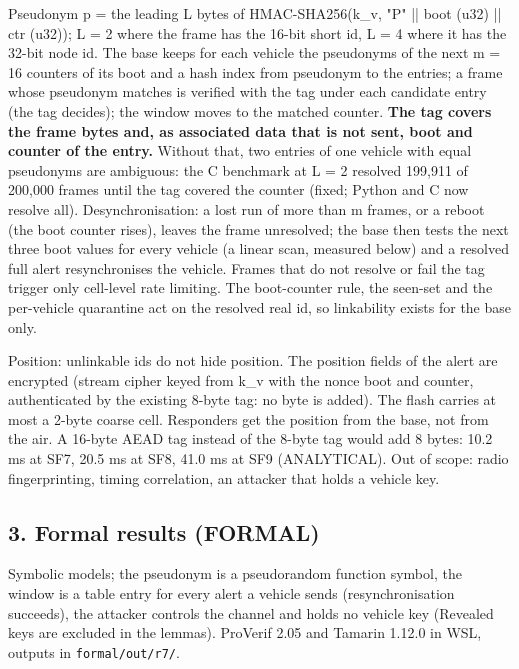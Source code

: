 Pseudonym p = the leading L bytes of HMAC-SHA256(k\_v, "P" || boot (u32) || ctr (u32)); L = 2 where the frame has the 16-bit short id, L = 4 where it has the 32-bit node id. The base keeps for each vehicle the pseudonyms of the next m = 16 counters of its boot and a hash index from pseudonym to the entries; a frame whose pseudonym matches is verified with the tag under each candidate entry (the tag decides); the window moves to the matched counter. \textbf{The tag covers the frame bytes and, as associated data that is not sent, boot and counter of the entry.} Without that, two entries of one vehicle with equal pseudonyms are ambiguous: the C benchmark at L = 2 resolved 199,911 of 200,000 frames until the tag covered the counter (fixed; Python and C now resolve all). Desynchronisation: a lost run of more than m frames, or a reboot (the boot counter rises), leaves the frame unresolved; the base then tests the next three boot values for every vehicle (a linear scan, measured below) and a resolved full alert resynchronises the vehicle. Frames that do not resolve or fail the tag trigger only cell-level rate limiting. The boot-counter rule, the seen-set and the per-vehicle quarantine act on the resolved real id, so linkability exists for the base only.

Position: unlinkable ids do not hide position. The position fields of the alert are encrypted (stream cipher keyed from k\_v with the nonce boot and counter, authenticated by the existing 8-byte tag: no byte is added). The flash carries at most a 2-byte coarse cell. Responders get the position from the base, not from the air. A 16-byte AEAD tag instead of the 8-byte tag would add 8 bytes: 10.2 ms at SF7, 20.5 ms at SF8, 41.0 ms at SF9 (ANALYTICAL). Out of scope: radio fingerprinting, timing correlation, an attacker that holds a vehicle key.

\subsection*{3. Formal results (FORMAL)}

Symbolic models; the pseudonym is a pseudorandom function symbol, the window is a table entry for every alert a vehicle sends (resynchronisation succeeds), the attacker controls the channel and holds no vehicle key (Revealed keys are excluded in the lemmas). ProVerif 2.05 and Tamarin 1.12.0 in WSL, outputs in \texttt{formal/out/r7/}.

